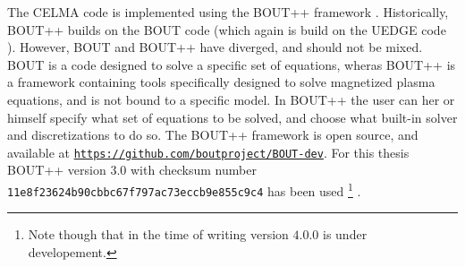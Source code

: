 \label{chap:BOUT++}
The CELMA code is implemented using the BOUT++ framework \cite{Dudson2009,Dudson2014a,Dudson2016}.
Historically, BOUT++ builds on the BOUT code \cite{Xu1998} (which again is build on the UEDGE code \cite{Rognlien1996}).
However, BOUT and BOUT++ have diverged, and should not be mixed.
BOUT is a code designed to solve a specific set of equations, wheras BOUT++ is a framework containing tools specifically designed to solve magnetized plasma equations, and is not bound to a specific model.
In BOUT++ the user can her or himself specify what set of equations to be solved, and choose what built-in solver and discretizations to do so.
The BOUT++ framework is open source, and available at \href{https://github.com/boutproject/BOUT-dev}{\texttt{https://github.com/boutproject/BOUT-dev}}.
For this thesis BOUT++ version $3.0$ with checksum number \texttt{11e8f23624b90cbbc67f797ac73eccb9e855c9c4} has been used%
%
\footnote{Note though that in the time of writing version $4.0.0$ is under developement.}%
%
.

